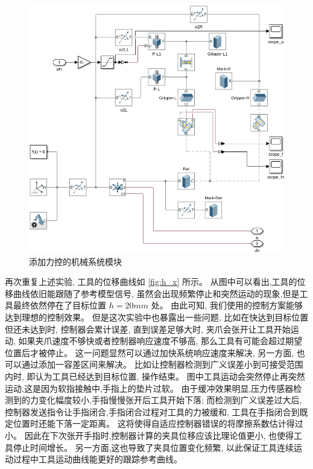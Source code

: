 \begin{figure}[!ht]
  \centering
  \includegraphics[width=13cm]{chapter04/pic/mech_x}
  \caption{\label{fig:mech_x}
    添加力控的机械系统模块}
  \vspace{-0.3cm}
\end{figure}

再次重复上述实验, 工具的位移曲线如 \ref{fig:h_x} 所示。
从图中可以看出,工具的位移曲线依旧能跟随了参考模型信号,
虽然会出现频繁停止和突然运动的现象,但是工具最终依然停在了目标位置 $h = 20 mm$ 处。
由此可知, 我们使用的控制方案能够达到理想的控制效果。
但是这次实验中也暴露出一些问题, 比如在快达到目标位置但还未达到时,
控制器会累计误差, 直到误差足够大时, 夹爪会张开让工具开始运动,
如果夹爪速度不够快或者控制器响应速度不够高, 那么工具有可能会超过期望位置后才被停止。
这一问题显然可以通过加快系统响应速度来解决, 另一方面, 也可以通过添加一容差区间来解决。
比如让控制器检测到广义误差小到可接受范围内时, 即认为工具已经达到目标位置, 操作结束。
图中工具运动会突然停止再突然运动,这是因为软指接触中,手指上的垫片过软。
由于缓冲效果明显,压力传感器检测到的力变化幅度较小,手指慢慢张开后工具开始下落;
而检测到广义误差过大后,控制器发送指令让手指闭合,手指闭合过程对工具的力被缓和,
工具在手指闭合到既定位置时还能下落一定距离。
这将使得自适应控制器错误的将摩擦系数估计得过小。
因此在下次张开手指时,控制器计算的夹具位移应该比理论值更小, 也使得工具停止时间增长。
另一方面,这也导致了夹具位置变化频繁,
以此保证工具连续运动过程中工具运动曲线能更好的跟踪参考曲线。

